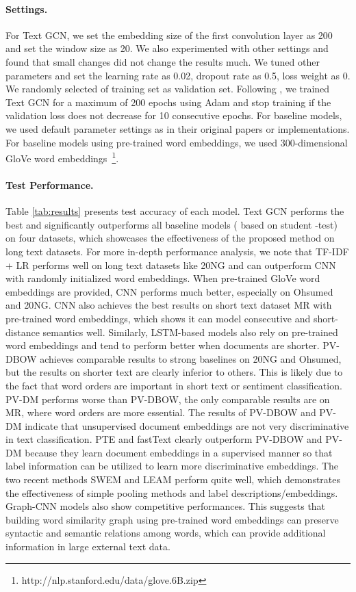 \documentclass[letterpaper]{article} \usepackage{aaai19}  \usepackage{times}  \usepackage{helvet}  \usepackage{courier}  \usepackage{url}  \usepackage{graphicx}  \frenchspacing  \usepackage{amsmath}
\begin{document}
\paragraph{Settings.}
For Text GCN, we set the embedding size of the first convolution layer as 200 and set the window size as 20. We also experimented with other settings and found that small changes did not change the results much. We tuned other parameters and set the learning rate as 0.02, dropout rate as 0.5,  loss weight as 0. We randomly selected  of training set as validation set. Following \cite{kipf2017semi}, we trained Text GCN for a maximum of 200 epochs using Adam \cite{kinga2015method} and stop training if the validation loss does not decrease for 10 consecutive epochs. 
For baseline models, we used default parameter settings as in their original papers or implementations. For baseline models using pre-trained word embeddings, we used 300-dimensional GloVe word embeddings~\cite{pennington2014glove}\footnote{http://nlp.stanford.edu/data/glove.6B.zip}.

\paragraph{Test Performance.}
Table \ref{tab:results} presents test accuracy of each model. Text GCN performs the best and significantly outperforms all baseline models ( based on student -test) on four datasets, which showcases the effectiveness of the proposed method on long text datasets. For more in-depth performance analysis, we note that TF-IDF + LR performs well on long text datasets like 20NG and can outperform CNN with randomly initialized word embeddings. When pre-trained GloVe word embeddings are provided, CNN performs much better, especially on Ohsumed and 20NG. CNN also achieves the best results on short text dataset MR with pre-trained word embeddings, which shows it can model consecutive and short-distance semantics well. Similarly, LSTM-based models also rely on pre-trained word embeddings and tend to perform better when documents are shorter. PV-DBOW achieves comparable results to strong baselines on 20NG and Ohsumed, but the results on shorter text are clearly inferior to others. This is likely due to the fact that word orders are important in short text or sentiment classification. PV-DM performs worse than PV-DBOW, the only comparable results are on MR, where word orders are more essential. The results of PV-DBOW and PV-DM indicate that unsupervised document embeddings are not very discriminative in text classification. PTE and fastText clearly outperform PV-DBOW and PV-DM because they learn document embeddings in a supervised manner so that label information can be utilized to learn more discriminative embeddings. The two recent methods SWEM and LEAM perform quite well, which demonstrates the effectiveness of simple pooling methods and label descriptions/embeddings. Graph-CNN models also show competitive performances. This suggests that building word similarity graph using pre-trained word embeddings can preserve syntactic and semantic relations among words, which can provide additional information in large external text data. 
\end{document}
